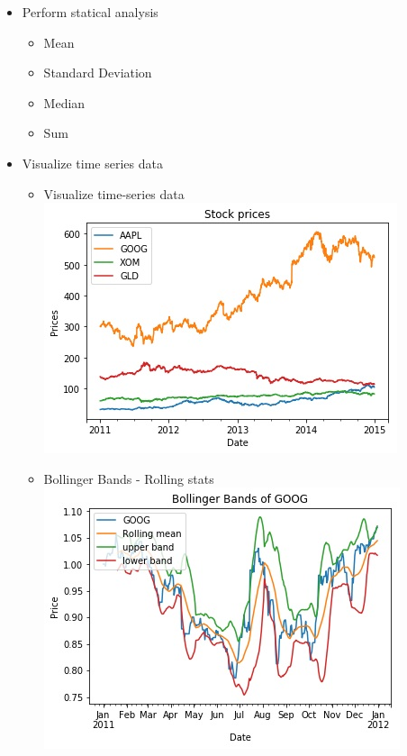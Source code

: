 \documentclass[11pt]{article}
\makeatletter
\def\maxwidth{\ifdim\Gin@nat@width>\linewidth\linewidth
    \else\Gin@nat@width\fi}
\let\Oldincludegraphics\includegraphics
\renewcommand{\includegraphics}[1]{\Oldincludegraphics[width=.8\maxwidth]{#1}}
\providecommand{\tightlist}{%
      \setlength{\itemsep}{0pt}\setlength{\parskip}{0pt}}
\makeatother
\begin{document}
\begin{itemize}
\tightlist
\item
  Perform statical analysis

  \begin{itemize}
  \tightlist
  \item
    Mean
  \item
    Standard Deviation
  \item
    Median
  \item
    Sum
  \end{itemize}
\item
  Visualize time series data

	  \begin{itemize}
	  \item
	    Visualize time-series data \\
	    \includegraphics{./figures/2.jpg}
	  \item
	    Bollinger Bands - Rolling stats \\
	    \includegraphics{./figures/3.jpg}
	  \end{itemize}
\end{itemize}
\end{document}
